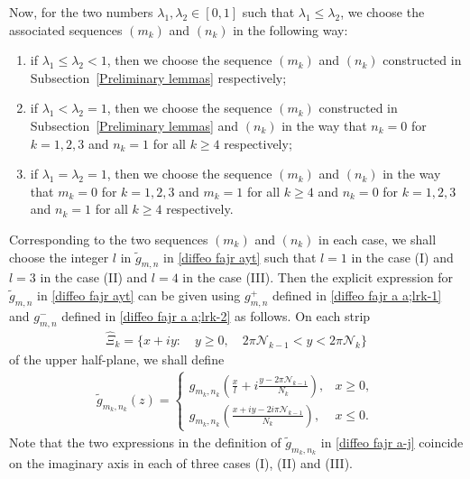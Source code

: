 \documentclass[12pt]{amsart}
\numberwithin{equation}{section}
\begin{document}
Now, for the two numbers $\lambda_1,\lambda_2\in[0,1]$ such that $\lambda_1\leq\lambda_2$, we choose the associated sequences $(m_k)$ and $(n_k)$ in the following way:
\begin{enumerate}
  \item [(I)] if $\lambda_1\leq \lambda_2<1$, then we choose the sequence $(m_k)$ and $(n_k)$ constructed in Subsection~\ref{Preliminary lemmas} respectively;
  \item [(II)] if $\lambda_1<\lambda_2=1$, then we choose the sequence $(m_k)$ constructed in Subsection~\ref{Preliminary lemmas} and $(n_k)$ in the way that $n_k=0$ for $k=1,2,3$ and $n_k=1$ for all $k\geq 4$ respectively;
  \item [(III)] if $\lambda_1=\lambda_2=1$, then we choose the sequence $(m_k)$ and $(n_k)$ in the way that $m_k=0$ for $k=1,2,3$ and $m_k=1$ for all $k\geq 4$ and $n_k=0$ for $k=1,2,3$ and $n_k=1$ for all $k\geq 4$ respectively.
\end{enumerate}
Corresponding to the two sequences $(m_k)$ and $(n_k)$ in each case, we shall choose the integer $l$ in $\tilde{g}_{m,n}$ in \eqref{diffeo  fajr  ayt} such that $l=1$ in the case (I) and $l=3$ in the case (II) and $l=4$ in the case (III). Then the explicit expression for $\tilde{g}_{m,n}$ in \eqref{diffeo  fajr  ayt} can be given using $g^{+}_{m,n}$ defined in \eqref{diffeo  fajr  a a;lrk-1} and $g^{-}_{m,n}$ defined in \eqref{diffeo  fajr  a a;lrk-2} as follows. On each strip
\begin{equation*}%
\begin{split}
\hat{\Xi}_k=\{x+iy: \quad y\geq0, \quad 2\pi\mathcal{N}_{k-1}<y< 2\pi\mathcal{N}_k\}
\end{split}
\end{equation*}
of the upper half-plane, we shall define
\begin{equation}\label{diffeo  fajr  a-j}
\begin{split}
\tilde{g}_{m_k,n_k}(z)=\left\{
\begin{array}{ll}
g_{m_k,n_k}\left(\frac{x}{l}+i\frac{y-2\pi\mathcal{N}_{k-1}}{N_k}\right),  &  x\geq 0, \\
g_{m_k,n_k}\left(\frac{x+iy-2i\pi\mathcal{N}_{k-1}}{N_k}\right), &  x\leq 0.
\end{array}
\right.
\end{split}
\end{equation}
Note that the two expressions in the definition of $\tilde{g}_{m_k,n_k}$ in \eqref{diffeo  fajr  a-j} coincide on the imaginary axis in each of three cases (I), (II) and (III).
\end{document}
